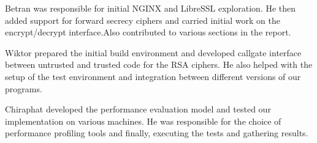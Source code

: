 \documentclass[../main.tex]{subfiles}
\begin{document}
Betran was responsible for initial NGINX and LibreSSL exploration. He then
added support for forward secrecy ciphers and carried initial work on the
encrypt/decrypt interface.Also contributed to various sections in the report. 

Wiktor prepared the initial build environment and developed callgate interface
between untrusted and trusted code for the RSA ciphers. He also helped with
the setup of the test environment and integration between different versions
of our programs.

Chiraphat developed the performance evaluation model and tested our
implementation on various machines. He was responsible for the choice of
performance profiling tools and finally, executing the tests and gathering
results.
\end{document}
